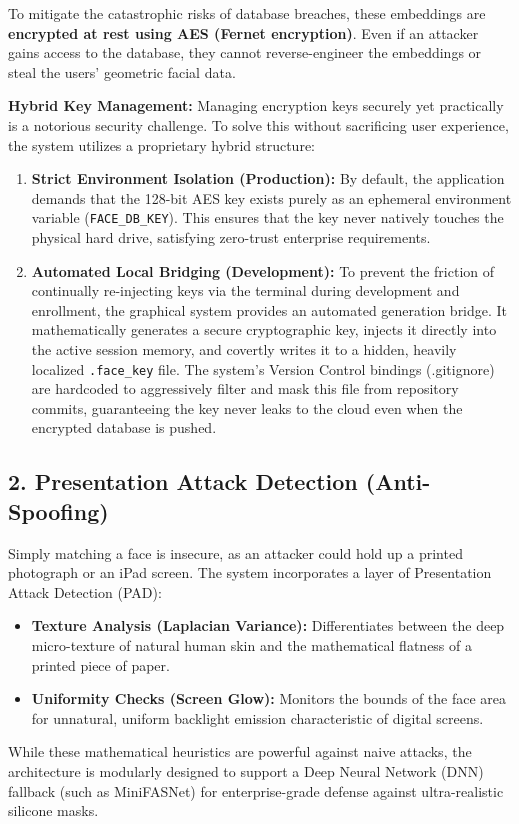 \documentclass[11pt, a4paper]{article}
\begin{document}
To mitigate the catastrophic risks of database breaches, these embeddings are \textbf{encrypted at rest using AES (Fernet encryption)}. Even if an attacker gains access to the database, they cannot reverse-engineer the embeddings or steal the users' geometric facial data.

\textbf{Hybrid Key Management:} Managing encryption keys securely yet practically is a notorious security challenge. To solve this without sacrificing user experience, the system utilizes a proprietary hybrid structure:
\begin{enumerate}
    \item \textbf{Strict Environment Isolation (Production):} By default, the application demands that the 128-bit AES key exists purely as an ephemeral environment variable (\texttt{FACE\_DB\_KEY}). This ensures that the key never natively touches the physical hard drive, satisfying zero-trust enterprise requirements.
    \item \textbf{Automated Local Bridging (Development):} To prevent the friction of continually re-injecting keys via the terminal during development and enrollment, the graphical system provides an automated generation bridge. It mathematically generates a secure cryptographic key, injects it directly into the active session memory, and covertly writes it to a hidden, heavily localized \texttt{.face\_key} file. The system's Version Control bindings (.gitignore) are hardcoded to aggressively filter and mask this file from repository commits, guaranteeing the key never leaks to the cloud even when the encrypted database is pushed.
\end{enumerate}

\subsection{2. Presentation Attack Detection (Anti-Spoofing)}
Simply matching a face is insecure, as an attacker could hold up a printed photograph or an iPad screen. The system incorporates a layer of Presentation Attack Detection (PAD):
\begin{itemize}
    \item \textbf{Texture Analysis (Laplacian Variance):} Differentiates between the deep micro-texture of natural human skin and the mathematical flatness of a printed piece of paper.
    \item \textbf{Uniformity Checks (Screen Glow):} Monitors the bounds of the face area for unnatural, uniform backlight emission characteristic of digital screens.
\end{itemize}
While these mathematical heuristics are powerful against naive attacks, the architecture is modularly designed to support a Deep Neural Network (DNN) fallback (such as MiniFASNet) for enterprise-grade defense against ultra-realistic silicone masks.
\end{document}
